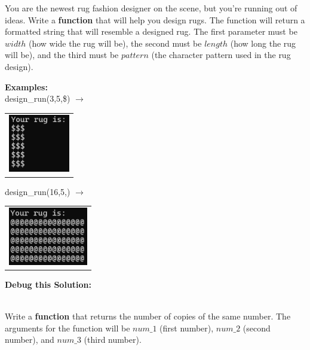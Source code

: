 	\item 
		You are the newest rug fashion designer on the scene, but you're running out of ideas. 
		Write a \textbf{function} that will help you design rugs.  The function will return a 
		formatted string that will resemble a designed rug. The first parameter must be $width$ 
		(how wide the rug will be), the second must be $length$ (how long the rug will be), 
		and the third must be $pattern$ (the character pattern used in the rug design).

		\textbf{Examples:} \\
			design\_run(3,5,\$) $\rightarrow$	\begin{tabular}{l}
			\includegraphics[height=1in]{./imgs/rug1_alt.PNG} \hspace{0.5in} \end{tabular}
			design\_run(16,5,\@) $\rightarrow$ \begin{tabular}{l}
			\includegraphics[height=1in]{./imgs/rug2_alt.PNG} \end{tabular}

		\textbf{Debug this Solution:}\\
		\mbox{ \hspace*{0.25in}	}

\pagebreak



	\item 
		Write a \textbf{function} that returns the number of copies of the same number. 
		The arguments for the function will be $num\_1$ (first number), $num\_2$ (second number), 
		and $num\_3$ (third number).\\

